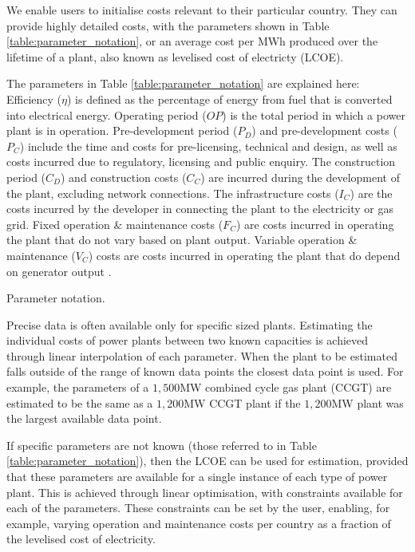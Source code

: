We enable users to initialise costs relevant to their particular country. They can provide highly detailed costs, with the parameters shown in Table \ref{table:parameter_notation}, or an average cost per MWh produced over the lifetime of a plant, also known as levelised cost of electricty (LCOE).

The parameters in Table \ref{table:parameter_notation} are explained here: Efficiency ($\eta$) is defined as the percentage of energy from fuel that is converted into electrical energy. Operating period ($OP$) is the total period in which a power plant is in operation. Pre-development period ($P_D$) and pre-development costs ($P_C$) include the time and costs for pre-licensing, technical and design, as well as costs incurred due to regulatory, licensing and public enquiry. The construction period ($C_D$) and construction costs ($C_C$) are incurred during the development of the plant, excluding network connections. The infrastructure costs ($I_C$) are the costs incurred by the developer in connecting the plant to the electricity or gas grid. Fixed operation \& maintenance costs ($F_C$) are costs incurred in operating the plant that do not vary based on plant output. Variable operation \& maintenance ($V_C$) costs are costs incurred in operating the plant that do depend on generator output \cite{Ltd2016}.



\begin{table}[h]
	\centering
	\caption{Parameter notation.}
	\label{table:parameter_notation}
\end{table}

Precise data is often available only for specific sized plants. Estimating the individual costs of power plants between two known capacities is achieved through linear interpolation of each parameter. When the plant to be estimated falls outside of the range of known data points the closest data point is used. For example, the parameters of a $1,500$MW combined cycle gas plant (CCGT) are estimated to be the same as a $1,200$MW CCGT plant if the $1,200$MW plant was the largest available data point. 

If specific parameters are not known (those referred to in Table \ref{table:parameter_notation}), then the LCOE can be used for estimation, provided that these parameters are available for a single instance of each type of power plant. This is achieved through linear optimisation, with constraints available for each of the parameters. These constraints can be set by the user, enabling, for example, varying operation and maintenance costs per country as a fraction of the levelised cost of electricity.


